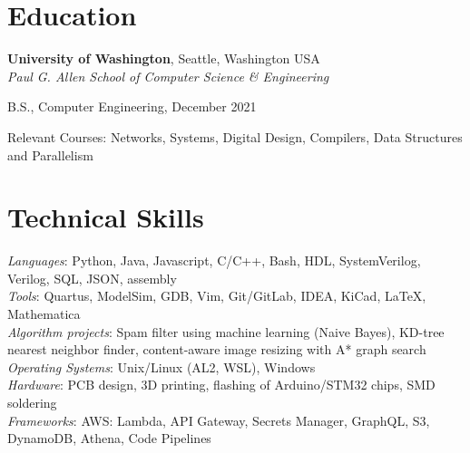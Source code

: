 \documentclass[margin,line]{res}
\newenvironment{list1}{
  \begin{list}{\ding{113}}{%
      \setlength{\itemsep}{0in}
      \setlength{\parsep}{0in} \setlength{\parskip}{0in}
      \setlength{\topsep}{0in} \setlength{\partopsep}{0in} 
      \setlength{\leftmargin}{0.17in}}}{\end{list}}
\begin{document}
\begin{resume}

%
%
\section{\sc Education}

{\bf University of Washington}, Seattle, Washington USA\\ %
{\em Paul G. Allen School of Computer Science \& Engineering} \\
\begin{list1}
\item[] B.S., Computer Engineering, December 2021
\item[] Relevant Courses: Networks, Systems, Digital Design, Compilers, Data Structures and Parallelism
\end{list1}



\section{\sc Technical Skills} 
	{\em Languages}:  
	Python, Java, Javascript, C/C++, Bash, HDL, SystemVerilog, Verilog, SQL, JSON, assembly
	\\
	{\em Tools}:  
	Quartus, ModelSim, GDB, Vim, Git/GitLab, IDEA, KiCad, \LaTeX, Mathematica 
	\\
	{\em Algorithm projects}: 
	Spam filter using machine learning (Naive Bayes), KD-tree
	nearest neighbor finder, content-aware image resizing with A* graph search
	\\
	{\em Operating Systems}:  
	Unix/Linux (AL2, WSL), Windows
	\\
	{\em Hardware}:  PCB design, 3D printing, flashing of Arduino/STM32 chips, SMD soldering
	\\
	{\em Frameworks}:  AWS: Lambda, API Gateway, Secrets Manager, GraphQL, S3, DynamoDB, Athena, Code Pipelines
	\\


\end{resume}
\end{document}
